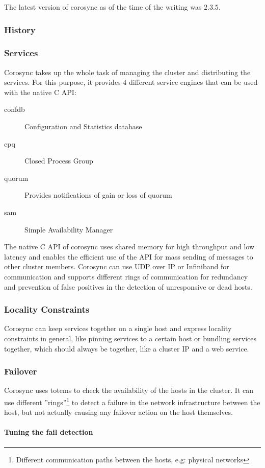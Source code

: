 The latest version of corosync as of the time of the writing was $2.3.5$.
\subsubsection{History}
\subsubsection{Services}
Corosync takes up the whole task of managing the cluster and distributing the services. For this purpose, it provides 4 different service engines that can be used with the native C \ac{API}:
\begin{description}
\item [confdb] Configuration and Statistics database
\item [cpq] Closed Process Group
\item [quorum] Provides notifications of gain or loss of quorum
\item [sam] Simple Availability Manager
\end{description}
The native C API of corosync uses shared memory for high throughput and low 
latency and enables the efficient use of the API for mass sending of messages to 
other cluster members.
\linebreak[3]
Corosync can use UDP over IP or Infiniband for communication and supports different 
rings of communication for redundancy and prevention of false positives in the 
detection of unresponsive or dead hosts.
\subsubsection{Locality Constraints}
Corosync can keep services together on a single host and express locality constraints in general,
like pinning services to a certain host or bundling services together, which should
always be together, like a cluster IP and a web service.
\subsubsection{Failover}
Corosync uses totems\cite{Amir95thetotem} to check the availability of the hosts
in the cluster. It can use different ''rings''\footnote{Different communication
paths between the hosts, e.g: physical networks} to detect a failure
in the network infrastructure between the host, but not actually causing any failover
action on the host themselves.
\paragraph{Tuning the fail detection}
